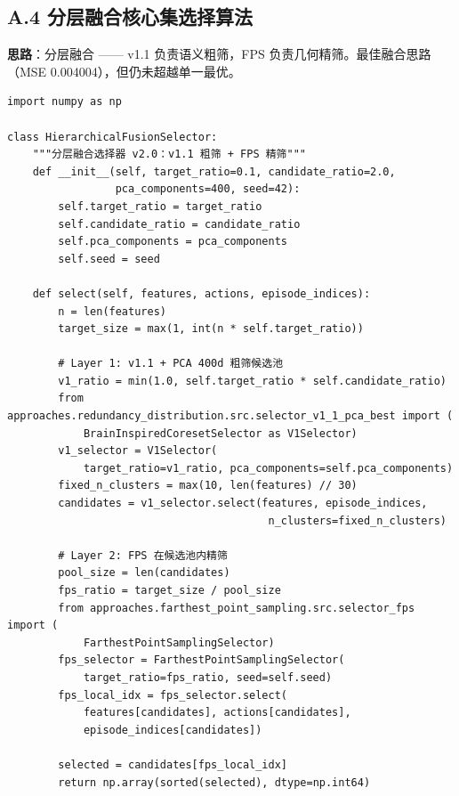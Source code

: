 \documentclass[12pt,a4paper]{article}
\begin{document}
\subsection{A.4 分层融合核心集选择算法}

\textbf{思路}：分层融合 —— v1.1 负责语义粗筛，FPS 负责几何精筛。最佳融合思路（MSE 0.004004），但仍未超越单一最优。

\begin{verbatim}
import numpy as np

class HierarchicalFusionSelector:
    """分层融合选择器 v2.0：v1.1 粗筛 + FPS 精筛"""
    def __init__(self, target_ratio=0.1, candidate_ratio=2.0,
                 pca_components=400, seed=42):
        self.target_ratio = target_ratio
        self.candidate_ratio = candidate_ratio
        self.pca_components = pca_components
        self.seed = seed
    
    def select(self, features, actions, episode_indices):
        n = len(features)
        target_size = max(1, int(n * self.target_ratio))
        
        # Layer 1: v1.1 + PCA 400d 粗筛候选池
        v1_ratio = min(1.0, self.target_ratio * self.candidate_ratio)
        from approaches.redundancy_distribution.src.selector_v1_1_pca_best import (
            BrainInspiredCoresetSelector as V1Selector)
        v1_selector = V1Selector(
            target_ratio=v1_ratio, pca_components=self.pca_components)
        fixed_n_clusters = max(10, len(features) // 30)
        candidates = v1_selector.select(features, episode_indices,
                                         n_clusters=fixed_n_clusters)
        
        # Layer 2: FPS 在候选池内精筛
        pool_size = len(candidates)
        fps_ratio = target_size / pool_size
        from approaches.farthest_point_sampling.src.selector_fps import (
            FarthestPointSamplingSelector)
        fps_selector = FarthestPointSamplingSelector(
            target_ratio=fps_ratio, seed=self.seed)
        fps_local_idx = fps_selector.select(
            features[candidates], actions[candidates],
            episode_indices[candidates])
        
        selected = candidates[fps_local_idx]
        return np.array(sorted(selected), dtype=np.int64)
\end{verbatim}
\end{document}
